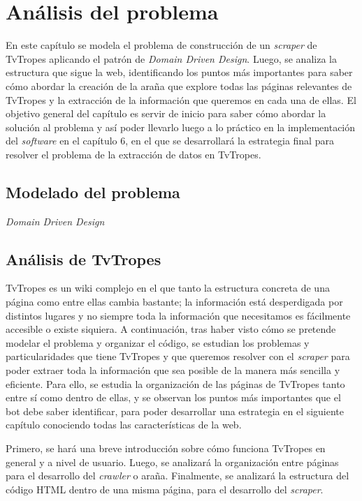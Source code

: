 \chapter{Análisis del problema}
En este capítulo se modela el problema de construcción de un \textit{scraper} de
TvTropes aplicando el patrón de \textit{Domain Driven Design}. Luego, se analiza
la estructura que sigue la web, identificando los puntos más importantes para
saber cómo abordar la creación de la araña que explore todas las páginas
relevantes de TvTropes y la extracción de la información que queremos en cada
una de ellas. El objetivo general del capítulo es servir de inicio para saber
cómo abordar la solución al problema y así poder llevarlo luego a lo práctico en
la implementación del \textit{software} en el capítulo 6, en el que se
desarrollará la estrategia final para resolver el problema de la extracción de
datos en TvTropes.

\section{Modelado del problema}

\textit{Domain Driven Design}

\section{Análisis de TvTropes}
TvTropes es un wiki complejo en el que tanto la estructura concreta de una
página como entre ellas cambia bastante; la información está desperdigada por
distintos lugares y no siempre toda la información que necesitamos es fácilmente
accesible o existe siquiera. A continuación, tras haber visto cómo se pretende
modelar el problema y organizar el código, se estudian los problemas y
particularidades que tiene TvTropes y que queremos resolver con el
\textit{scraper} para poder extraer toda la información que sea posible de la
manera más sencilla y eficiente. Para ello, se estudia la organización de las
páginas de TvTropes tanto entre sí como dentro de ellas, y se observan los
puntos más importantes que el bot debe saber identificar, para poder desarrollar
una estrategia en el siguiente capítulo conociendo todas las características de
la web.

Primero, se hará una breve introducción sobre cómo funciona TvTropes en general
y a nivel de usuario. Luego, se analizará la organización entre páginas para el
desarrollo del \textit{crawler} o araña. Finalmente, se analizará la estructura
del código HTML dentro de una misma página, para el desarrollo del
\textit{scraper}.

